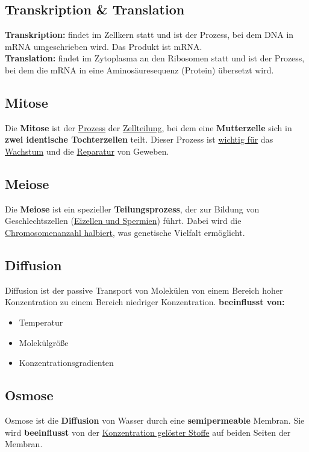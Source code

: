 \documentclass{article}
\begin{document}
\newpage
\subsection{Transkription \& Translation}
\textbf{Transkription: } findet im Zellkern statt und ist der Prozess, bei dem DNA in mRNA umgeschrieben wird. Das Produkt ist mRNA. \newline
\\
\textbf{Translation: } findet im Zytoplasma an den Ribosomen statt und ist der Prozess, bei dem die mRNA in eine Aminosäuresequenz (Protein) übersetzt wird.
\subsection{Mitose}
Die \textbf{Mitose} ist der \underline{Prozess} der \underline{Zellteilung}, bei dem eine \textbf{Mutterzelle} sich in \textbf{zwei identische Tochterzellen} teilt. \newline
Dieser Prozess ist \underline{wichtig für} das \underline{Wachstum} und die \underline{Reparatur} von Geweben.

\subsection{Meiose}
Die \textbf{Meiose} ist ein spezieller \textbf{Teilungsprozess}, der zur Bildung von Geschlechtszellen (\underline{Eizellen und Spermien}) führt. \newline Dabei wird die \underline{Chromosomenanzahl halbiert}, was genetische Vielfalt ermöglicht.

\subsection{Diffusion}
Diffusion ist der passive Transport von Molekülen von einem Bereich hoher Konzentration zu einem Bereich niedriger Konzentration. \newline
\textbf{beeinflusst von: }
\begin{itemize}
    \item Temperatur
    \item Molekülgröße
    \item Konzentrationsgradienten
\end{itemize}

\subsection{Osmose}
Osmose ist die \textbf{Diffusion} von Wasser durch eine \textbf{semipermeable} Membran. \newline
Sie wird \textbf{beeinflusst} von der \underline{Konzentration gelöster Stoffe} auf beiden Seiten der Membran.
\end{document}
